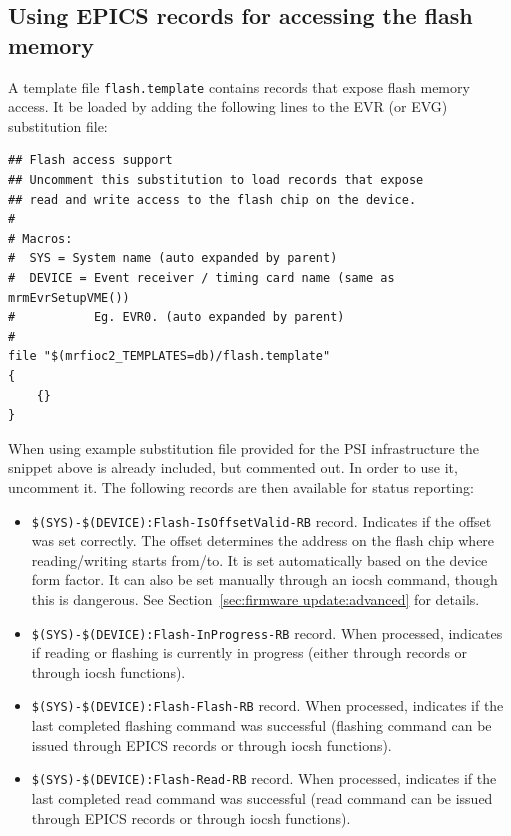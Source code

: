 \documentclass[12pt,a4paper]{article}
\begin{document}
\subsection{Using EPICS records for accessing the flash memory}
A template file \texttt{flash.template} contains records that expose flash memory access. It be loaded by adding the following lines to the EVR (or EVG) substitution file:
\begin{verbatim}
## Flash access support
## Uncomment this substitution to load records that expose
## read and write access to the flash chip on the device.
#
# Macros:
#  SYS = System name (auto expanded by parent)
#  DEVICE = Event receiver / timing card name (same as mrmEvrSetupVME())
#           Eg. EVR0. (auto expanded by parent)
# 
file "$(mrfioc2_TEMPLATES=db)/flash.template" 
{
	{}
}
\end{verbatim}
When using example substitution file provided for the PSI infrastructure the snippet above is already included, but commented out. In order to use it, uncomment it.
The following records are then available for status reporting:
\begin{itemize}
	\item \texttt{\$(SYS)-\$(DEVICE):Flash-IsOffsetValid-RB} record. Indicates if the offset was set correctly. The offset determines the address on the flash chip where reading/writing starts from/to. It is set automatically based on the device form factor. It can also be set manually through an iocsh command, though this is dangerous. See Section~\ref{sec:firmware update:advanced} for details.
	\item \texttt{\$(SYS)-\$(DEVICE):Flash-InProgress-RB} record. When processed, indicates if reading or flashing is currently in progress (either through records or through iocsh functions).
	\item \texttt{\$(SYS)-\$(DEVICE):Flash-Flash-RB} record. When processed, indicates if the last completed flashing command was successful (flashing command can be issued through EPICS records or through iocsh functions).
	\item \texttt{\$(SYS)-\$(DEVICE):Flash-Read-RB} record. When processed, indicates if the last completed read command was successful (read command can be issued through EPICS records or through iocsh functions).
\end{itemize}
\end{document}
